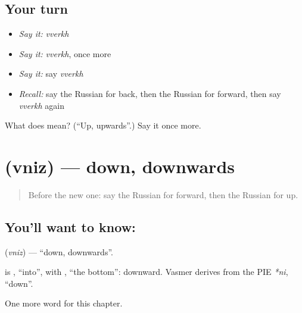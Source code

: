 \subsection*{Your turn}
\begin{itemize}
\raggedright
  \item \emph{Say it:} \emph{vverkh}
  \item \emph{Say it:} \emph{vverkh}, once more
  \item \emph{Say it:} say \emph{vverkh}
  \item \emph{Recall:} say the Russian for back, then the Russian for forward, then say \emph{vverkh} again
\end{itemize}

\begin{tcolorbox}[breakable,colback=teal!4,colframe=teal!35!black,title={Before you move on}]
What does  mean? (\textquotedblleft{}Up, upwards\textquotedblright{}.) Say it once more.
\end{tcolorbox}
\section[\texorpdfstring{\ru{вниз} (vniz)}{вниз (vniz)}]{ (vniz) — down, downwards}

\label{lesson:RU-C214-vniz}



\begin{quote}
Before the new one: say the Russian for forward, then the Russian for up.
\end{quote}

\subsection*{You'll want to know: }
\textbf{} (\emph{vniz}) — \textquotedblleft{}down, downwards\textquotedblright{}.

\begin{cousinweb}
\textbf{} is \emph{}, \textquotedblleft{}into\textquotedblright{}, with \emph{}, \textquotedblleft{}the bottom\textquotedblright{}: downward. Vasmer derives \emph{} from the PIE \emph{*ni}, \textquotedblleft{}down\textquotedblright{}.
\end{cousinweb}

\begin{grammarlens}[title={What you've built}]
One more word for this chapter.
\end{grammarlens}

